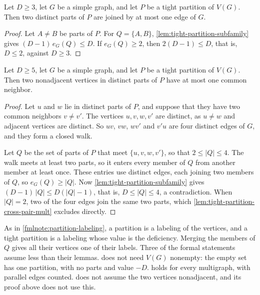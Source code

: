 \begin{lemma}
  \label{lem:tight-partition-cross-pair-mult}
  \leanok
  Let $D \ge 3$, let $G$ be a simple graph, and let $P$ be a tight
  partition of $V(G)$. Then two distinct parts of $P$ are joined by at
  most one edge of $G$.
\end{lemma}
\begin{proof}
  \leanok
  Let $A \ne B$ be parts of $P$. For $Q = \{A, B\}$,
  \cref{lem:tight-partition-subfamily} gives $(D-1)\,e_G(Q) \le D$. If
  $e_G(Q) \ge 2$, then $2(D-1) \le D$, that is, $D \le 2$, against
  $D \ge 3$.
\end{proof}

\begin{lemma}
  \label{lem:tight-partition-cross-pair-nbr}
  \leanok
  Let $D \ge 5$, let $G$ be a simple graph, and let $P$ be a tight
  partition of $V(G)$. Then two nonadjacent vertices in distinct parts
  of $P$ have at most one common neighbor.
\end{lemma}
\begin{proof}
  \leanok
  Let $u$ and $w$ lie in distinct parts of $P$, and suppose that they
  have two common neighbors $v \ne v'$. The vertices $u, v, w, v'$ are
  distinct, as $u \ne w$ and adjacent vertices are distinct. So $uv$,
  $vw$, $wv'$ and $v'u$ are four distinct edges of $G$, and they form a
  closed walk.

  Let $Q$ be the set of parts of $P$ that meet $\{u, v, w, v'\}$, so
  that $2 \le |Q| \le 4$. The walk meets at least two parts, so it
  enters every member of $Q$ from another member at least once. These
  entries use distinct edges, each joining two members of $Q$, so
  $e_G(Q) \ge |Q|$. Now \cref{lem:tight-partition-subfamily} gives
  $(D-1)\,|Q| \le D(|Q| - 1)$, that is, $D \le |Q| \le 4$, a
  contradiction. When $|Q| = 2$, two of the four edges join the same two
  parts, which \cref{lem:tight-partition-cross-pair-mult} excludes
  directly.
\end{proof}

\begin{fmlnote}
  \label{fmlnote:tight-partition-consumed-forms}
  As in \cref{fmlnote:partition-labeling}, a partition is a labeling of
  the vertices, and a tight partition is a labeling whose value is the
  deficiency. Merging the members of $Q$ gives all their vertices one of
  their labels. Three of the formal statements assume less than their
  lemmas.  does not need $V(G)$
  nonempty: the empty set has one partition, with no parts and value
  $-D$.  holds for every
  multigraph, with parallel edges counted.
   does not assume the two
  vertices nonadjacent, and its proof above does not use this.
\end{fmlnote}

